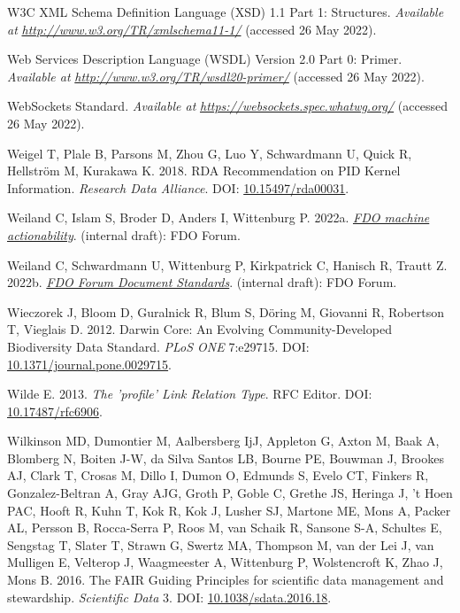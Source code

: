 \begin{CSLReferences}{1}{0}
\leavevmode{}%
W3C XML Schema Definition Language (XSD) 1.1 Part 1: Structures. \emph{Available at} \href{http://www.w3.org/TR/xmlschema11-1/}{\emph{http://www.w3.org/TR/xmlschema11-1/}} (accessed 26 May 2022).

\leavevmode{}%
Web Services Description Language (WSDL) Version 2.0 Part 0: Primer. \emph{Available at} \href{http://www.w3.org/TR/wsdl20-primer/}{\emph{http://www.w3.org/TR/wsdl20-primer/}} (accessed 26 May 2022).

\leavevmode{}%
WebSockets Standard. \emph{Available at} \href{https://websockets.spec.whatwg.org/}{\emph{https://websockets.spec.whatwg.org/}} (accessed 26 May 2022).

\leavevmode{}%
Weigel T, Plale B, Parsons M, Zhou G, Luo Y, Schwardmann U, Quick R, Hellström M, Kurakawa K. 2018. RDA Recommendation on PID Kernel Information. \emph{Research Data Alliance}. DOI: \href{https://doi.org/10.15497/rda00031}{10.15497/rda00031}.

\leavevmode{}%
Weiland C, Islam S, Broder D, Anders I, Wittenburg P. 2022a. \emph{\href{https://docs.google.com/document/d/1GHFPAUGpNvYaxctkx-CpvY1vKf_aGZpSlWGOWvyXSiQ/edit}{FDO machine actionability}}. (internal draft): FDO Forum.

\leavevmode{}%
Weiland C, Schwardmann U, Wittenburg P, Kirkpatrick C, Hanisch R, Trautt Z. 2022b. \emph{\href{https://docs.google.com/document/d/1lPNBBROjEoZ6fTfrtdqcMa3Q2G27PoC_/edit}{FDO Forum Document Standards}}. (internal draft): FDO Forum.

\leavevmode{}%
Wieczorek J, Bloom D, Guralnick R, Blum S, Döring M, Giovanni R, Robertson T, Vieglais D. 2012. Darwin Core: An Evolving Community-Developed Biodiversity Data Standard. \emph{PLoS ONE} 7:e29715. DOI: \href{https://doi.org/10.1371/journal.pone.0029715}{10.1371/journal.pone.0029715}.

\leavevmode{}%
Wilde E. 2013. \emph{The 'profile' Link Relation Type}. RFC Editor. DOI: \href{https://doi.org/10.17487/rfc6906}{10.17487/rfc6906}.

\leavevmode{}%
Wilkinson MD, Dumontier M, Aalbersberg IjJ, Appleton G, Axton M, Baak A, Blomberg N, Boiten J-W, da Silva Santos LB, Bourne PE, Bouwman J, Brookes AJ, Clark T, Crosas M, Dillo I, Dumon O, Edmunds S, Evelo CT, Finkers R, Gonzalez-Beltran A, Gray AJG, Groth P, Goble C, Grethe JS, Heringa J, 't Hoen PAC, Hooft R, Kuhn T, Kok R, Kok J, Lusher SJ, Martone ME, Mons A, Packer AL, Persson B, Rocca-Serra P, Roos M, van Schaik R, Sansone S-A, Schultes E, Sengstag T, Slater T, Strawn G, Swertz MA, Thompson M, van der Lei J, van Mulligen E, Velterop J, Waagmeester A, Wittenburg P, Wolstencroft K, Zhao J, Mons B. 2016. The FAIR Guiding Principles for scientific data management and stewardship. \emph{Scientific Data} 3. DOI: \href{https://doi.org/10.1038/sdata.2016.18}{10.1038/sdata.2016.18}.


\end{CSLReferences}
